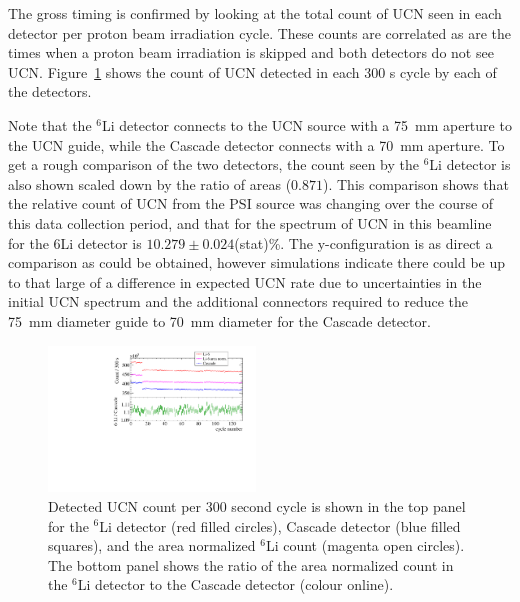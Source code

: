 \documentclass[letter,twocolumn,preprint,3p,numbers,sort&compress]{elsarticle}
\begin{document}
The gross timing is confirmed by looking at the total count of UCN
seen in each detector per proton beam irradiation cycle.  These counts
are correlated as are the times when a proton beam irradiation is
skipped and both detectors do not see UCN.
Figure~\ref{fig:ratecompare} shows the count of UCN detected in each
300 s cycle by each of the detectors.

Note that the $^{6}$Li detector connects to the UCN source with a
75~mm aperture to the UCN guide, while the Cascade detector connects
with a 70~mm aperture.  To get a rough comparison of the two
detectors, the count seen by the $^{6}$Li detector is also shown
scaled down by the ratio of areas ($0.871$).  This comparison shows
that the relative count of UCN from the PSI source was changing over
the course of this data collection period, and that for the spectrum
of UCN in this beamline for the ${6}$Li detector is $10.279 \pm
0.024$(stat)\%.  The y-configuration is as direct a comparison as
could be obtained, however simulations indicate there could be up to
that large of a difference in expected UCN rate due to uncertainties
in the initial UCN spectrum and the additional connectors required to
reduce the 75~mm diameter guide to 70~mm diameter for the Cascade
detector.

\begin{figure}[!htpb]
\centering \includegraphics[width=0.49\textwidth]{figures/cascade_to_li_ratecompare.pdf}
\caption{Detected UCN count per 300 second cycle is shown in the top
  panel for the ${^6}$Li detector (red filled circles), Cascade
  detector (blue filled squares), and the area normalized ${^6}$Li
  count (magenta open circles).  The bottom panel shows the ratio of
  the area normalized count in the $^{6}$Li detector to the Cascade
  detector (colour online).}
\label{fig:ratecompare}
\end{figure}
\end{document}
